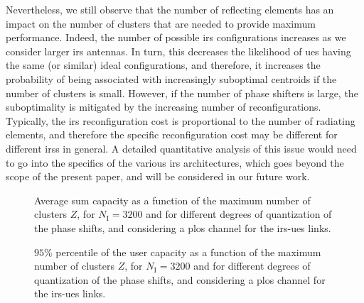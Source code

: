 Nevertheless, we still observe that the number of reflecting elements has an impact on the number of clusters that are needed to provide maximum performance. 
Indeed, the number of possible \gls{irs} configurations increases as we consider larger \gls{irs} antennas. In turn, this decreases the likelihood of \glspl{ue} having the same (or similar) ideal configurations, and therefore, it increases the probability of being associated with increasingly suboptimal centroids if the number of clusters is small. However, if the number of phase shifters is large, the suboptimality is mitigated by the increasing number of reconfigurations. Typically, the \gls{irs} reconfiguration cost is proportional to the number of
radiating elements, and therefore the specific reconfiguration cost may be different for different \glspl{irs} in general. A detailed quantitative analysis of this issue would need to go into the specifics of the various \gls{irs} architectures, which goes beyond the scope of the present paper, and will be considered in our future work.

\begin{figure}[t]
    \centering
    \setlength{}
    \setlength{}
    
    \caption{Average sum capacity as a function of the maximum number of clusters   $Z$, for $N_{\mathrm I}=3200$ and for different degrees of quantization of the phase shifts, and considering a \gls{plos} channel for the \gls{irs}-\glspl{ue} links.}
    \label{fig:cap_vs_bits}
\end{figure}
\begin{figure}[t]
    \centering
    \setlength{}
    \setlength{}
    
    \caption{$95$\% percentile of the user capacity as a function of the maximum number of clusters   $Z$, for $N_{\mathrm I}=3200$ and for different degrees of quantization of the phase shifts, and considering a \gls{plos} channel for the \gls{irs}-\glspl{ue} links.}
    \label{fig:quantile_vs_bits}
\end{figure}

